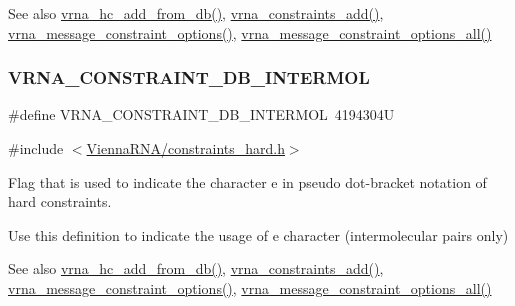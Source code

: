 \begin{DoxySeeAlso}{See also}
\hyperlink{group__hard__constraints_ga5b4de3247b67358080c176b94591a8e6}{vrna\+\_\+hc\+\_\+add\+\_\+from\+\_\+db()}, \hyperlink{group__constraints_ga35a401f680969a556858a8dd5f1d07cc}{vrna\+\_\+constraints\+\_\+add()}, \hyperlink{group__constraints_gaa1f20b53bf09ac2e6b0dbb13f7d89670}{vrna\+\_\+message\+\_\+constraint\+\_\+options()}, \hyperlink{group__constraints_gaec7e13fa0465c2acc7a621d1aecb709f}{vrna\+\_\+message\+\_\+constraint\+\_\+options\+\_\+all()} 
\end{DoxySeeAlso}
\mbox{\label{group__hard__constraints_ga31d0ebb9755ca8a4acafc14f00ca755d}} 
\subsubsection{\texorpdfstring{V\+R\+N\+A\+\_\+\+C\+O\+N\+S\+T\+R\+A\+I\+N\+T\+\_\+\+D\+B\+\_\+\+I\+N\+T\+E\+R\+M\+OL}{VRNA\_CONSTRAINT\_DB\_INTERMOL}}
{\footnotesize\ttfamily \#define V\+R\+N\+A\+\_\+\+C\+O\+N\+S\+T\+R\+A\+I\+N\+T\+\_\+\+D\+B\+\_\+\+I\+N\+T\+E\+R\+M\+OL~4194304U}



{\ttfamily \#include $<$\hyperlink{constraints__hard_8h}{Vienna\+R\+N\+A/constraints\+\_\+hard.\+h}$>$}



Flag that is used to indicate the character \textquotesingle{}e\textquotesingle{} in pseudo dot-\/bracket notation of hard constraints. 

Use this definition to indicate the usage of \textquotesingle{}e\textquotesingle{} character (intermolecular pairs only)

\begin{DoxySeeAlso}{See also}
\hyperlink{group__hard__constraints_ga5b4de3247b67358080c176b94591a8e6}{vrna\+\_\+hc\+\_\+add\+\_\+from\+\_\+db()}, \hyperlink{group__constraints_ga35a401f680969a556858a8dd5f1d07cc}{vrna\+\_\+constraints\+\_\+add()}, \hyperlink{group__constraints_gaa1f20b53bf09ac2e6b0dbb13f7d89670}{vrna\+\_\+message\+\_\+constraint\+\_\+options()}, \hyperlink{group__constraints_gaec7e13fa0465c2acc7a621d1aecb709f}{vrna\+\_\+message\+\_\+constraint\+\_\+options\+\_\+all()} 
\end{DoxySeeAlso}
\mbox{\label{group__hard__constraints_ga75cfab03cdc97c95b3ce8bb29f52b08e}} 
